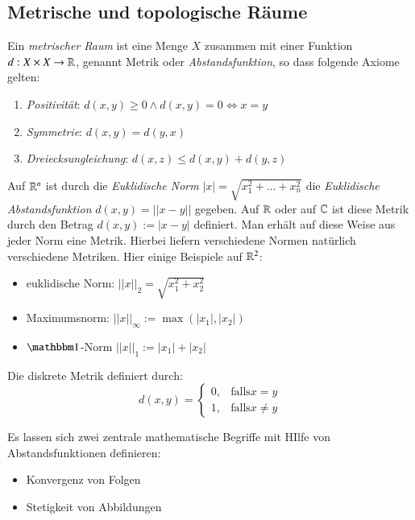 \documentclass[a4paper,10pt]{scrartcl}
\renewcommand{\equiv}{\Longleftrightarrow}
\begin{document}
\subsection{Metrische und topologische Räume}
\begin{df}
Ein \emph{metrischer Raum} ist eine Menge $X$ zusammen mit einer Funktion $d: X \times X \rightarrow \mathbb{R}$, genannt Metrik oder \emph{Abstandsfunktion}, so dass folgende Axiome gelten:
\begin{enumerate}
\item \emph{Positivität}: $d(x,y)\ge 0 \land d(x,y)=0\equiv x=y$
\item \emph{Symmetrie}: $d(x,y)=d(y,x)$
\item \emph{Dreiecksungleichung}: $d(x,z) \le d(x,y)+d(y,z)$
\end{enumerate}
\end{df}
\begin{ex*}
Auf $\mathbb{R}^n$ ist durch die \emph{Euklidische Norm} $|x|=\sqrt{x_1^2+...+x_n^2}$ die \emph{Euklidische Abstandsfunktion} $d(x,y)=||x-y||$ gegeben. Auf $\mathbb{R}$ oder auf $\mathbb{C}$ ist diese Metrik durch den Betrag $d(x,y):=|x-y|$ definiert.  Man erhält auf diese Weise aus jeder Norm eine Metrik. Hierbei liefern verschiedene Normen natürlich verschiedene Metriken. Hier einige Beispiele auf $\mathbb{R}^2$:
\begin{itemize} 
\item euklidische Norm: $||x||_2=\sqrt{x_1^2+x_2^2}$
\item Maximumsnorm: $||x||_\infty := \max(|x_1|, |x_2|)$
\item $\Eins$-Norm $||x||_1 := |x_1|+|x_2|$
\end{itemize}
\end{ex*}

\begin{ex*}
Die diskrete Metrik definiert durch:
\[
d(x,y)=\begin{cases}
  0, & \text{falls} x=y \\ 1, & \text{falls} x\neq y
\end{cases}
\]
\end{ex*}

Es lassen sich zwei zentrale mathematische Begriffe mit HIlfe von Abstandsfunktionen definieren:
\begin{itemize}
\item Konvergenz von Folgen
\item Stetigkeit von Abbildungen
\end{itemize}
\end{document}
